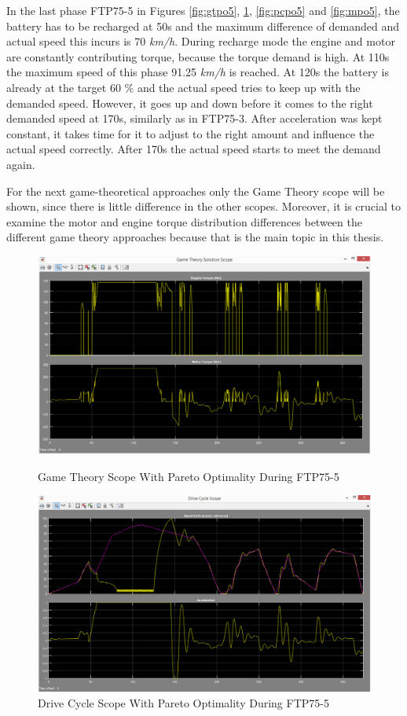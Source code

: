 In the last phase FTP75-5 in Figures \ref{fig:gtpo5}, \ref{fig:dcpo5}, \ref{fig:pcpo5} and \ref{fig:mpo5}, the battery has to be recharged at 50s and the maximum difference of demanded and actual speed this incurs is 70 \textit{km/h}. During recharge mode the engine and motor are constantly contributing torque, because the torque demand is high. At 110s the maximum speed of this phase 91.25 \textit{km/h} is reached. At 120s the battery is already at the target 60 \% and the actual speed tries to keep up with the demanded speed. However, it goes up and down before it comes to the right demanded speed at 170s, similarly as in FTP75-3. After acceleration was kept constant, it takes time for it to adjust to the right amount and influence the actual speed correctly. After 170s the actual speed starts to meet the demand again. 

For the next game-theoretical approaches only the Game Theory scope will be shown, since there is little difference in the other scopes. Moreover, it is crucial to examine the motor and engine torque distribution differences between the different game theory approaches because that is the main topic in this thesis.

\begin{figure}[hp]
\centering
\includegraphics[scale=0.475]{figures/Pareto/FTP75-5/gameTheory05Juli}
\caption{Game Theory Scope With Pareto Optimality During FTP75-5}
\label{fig:gtpo5}
\includegraphics[scale=0.45]{figures/Pareto/FTP75-5/driveCycle05Juli}
\caption{Drive Cycle Scope With Pareto Optimality During FTP75-5}
\label{fig:dcpo5}
\end{figure}

